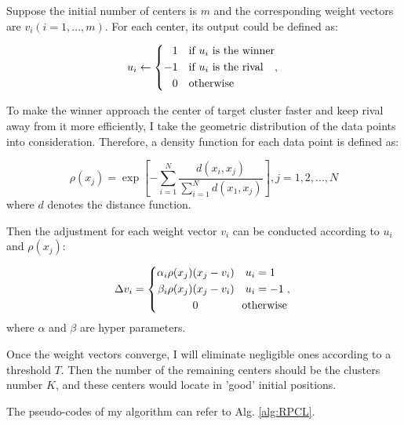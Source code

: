 \documentclass[12pt,a4paper]{article}
\theoremstyle{definition}
\begin{document}
Suppose the initial number of centers is $m$ and the corresponding weight vectors are $v_{i}(i=1,...,m)$. For each center, its output could be defined as:

\begin{equation}
	\centering
	u_{i}\leftarrow \left\{
		\begin{aligned}
			1 & \quad \text{if $u_{i}$ is the winner} \\
			-1 & \quad \text{if $u_{i}$ is the rival} \\
			0 & \quad \text{otherwise}
		\end{aligned},
	\right.
	\label{eqn:1}
\end{equation}

To make the winner approach the center of target cluster faster and keep rival away from it more efficiently, I take the geometric distribution of the data points into consideration. Therefore, a density function for each data point is defined as:

\begin{equation}
	\rho(x_{j}) = \exp[-\sum\limits_{i=1}^{N}\dfrac{d(x_{i}, x_{j})}{\sum\limits_{i=1}^{N}d(x_{1}, x_{j})}], j = 1,2,...,N
\end{equation}
where $d$ denotes the distance function.

Then the adjustment for each weight vector $v_{i}$ can be conducted according to $u_{i}$ and $\rho(x_{j})$:

\begin{equation}
	\centering
	\Delta v_{i} = \left\{
		\begin{aligned}
			\alpha_{i}\rho(x_{j})&(x_{j}-v_{i}) \quad u_{i} = 1 \\
			\beta_{i}\rho(x_{j})&(x_{j}-v_{i}) \quad u_{i} = -1 \\
			& 0 \quad \quad \qquad \text{otherwise}
		\end{aligned},
	\right.
	\label{eqn:4}
\end{equation}
where $\alpha$ and $\beta$ are hyper parameters.

Once the weight vectors converge, I will eliminate negligible ones according to a threshold $T$. Then the number of the remaining centers should be the clusters number $K$, and these centers would locate in 'good' initial positions.

\vspace{0.008\linewidth}
The pseudo-codes of my algorithm can refer to Alg. \ref{alg:RPCL}.
\end{document}
